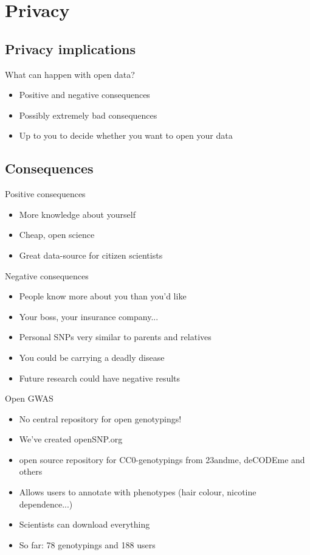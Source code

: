 \documentclass[12pt,a4paper]{beamer}
\begin{document}
\section{Privacy}
\subsection{Privacy implications}
\begin{frame}{What can happen with open data?}
\begin{itemize}
\item Positive and negative consequences
\pause \item Possibly extremely bad consequences
\pause \item Up to you to decide whether you want to open your data
\end{itemize}
\end{frame}

\subsection{Consequences}
\begin{frame}{Positive consequences}
\begin{itemize}
\item More knowledge about yourself
\pause \item Cheap, open science
\pause \item Great data-source for citizen scientists
\end{itemize}
\end{frame}

\begin{frame}{Negative consequences}
\begin{itemize}
\item People know more about you than you'd like
\pause \item Your boss, your insurance company...
\pause \item Personal SNPs very similar to parents and relatives
\pause \item You could be carrying a deadly disease
\pause \item Future research could have negative results 
\end{itemize}
\end{frame}



\begin{frame}{Open GWAS}
\begin{itemize}
\item No central repository for open genotypings!
\pause \item We've created openSNP.org
\pause \item open source repository for CC0-genotypings from 23andme, deCODEme and others
\pause \item Allows users to annotate with phenotypes (hair colour, nicotine dependence...)
\pause \item Scientists can download everything
\pause \item So far: 78 genotypings and 188 users %
\end{itemize}
\end{frame}
\end{document}

